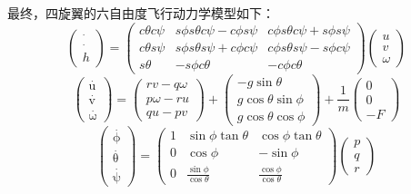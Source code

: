 最终，四旋翼的六自由度飞行动力学模型如下：
\begin{equation}
\left( \begin{array}{c}
\mathop {{p_n}}\limits^ \cdot  \\
\mathop {{p_e}}\limits^ \cdot  \\
h
\end{array} \right) = \left( {\begin{array}{*{20}{c}}
{c\theta c\psi }&{s\phi s\theta c\psi  - c\phi s\psi }&{c\phi s\theta c\psi  + s\phi s\psi }\\
{c\theta s\psi }&{s\phi s\theta s\psi  + c\phi c\psi }&{c\phi s\theta s\psi  - s\phi c\psi }\\
{s\theta }&{ - s\phi c\theta }&{ - c\phi c\theta }
\end{array}} \right)\left( \begin{array}{l}
u\\
v\\
\omega
\end{array} \right)
\end{equation}
\begin{equation}
\left( \begin{array}{l}
\mathop u\limits^ \cdot  \\
\mathop v\limits^ \cdot  \\
\mathop \omega \limits^ \cdot
\end{array} \right) = \left( \begin{array}{l}
rv - q\omega \\
p\omega  - ru\\
qu - pv
\end{array} \right) + \left( \begin{array}{c}
 - g\sin \theta \\
g\cos \theta \sin \phi \\
g\cos \theta \cos \phi
\end{array} \right) + \frac{1}{m}\left( \begin{array}{c}
0\\
0\\
 - F
\end{array} \right)
\end{equation}
\begin{equation}
\left( \begin{array}{l}
\mathop \phi \limits^ \cdot  \\
\mathop \theta \limits^ \cdot  \\
\mathop \psi \limits^ \cdot
\end{array} \right) = \left( {\begin{array}{*{20}{c}}
1&{\sin \phi \tan \theta }&{\cos \phi \tan \theta }\\
0&{\cos \phi }&{ - \sin \phi }\\
0&{\frac{{\sin \phi }}{{\cos \theta }}}&{\frac{{\cos \phi }}{{\cos \theta }}}
\end{array}} \right)\left( \begin{array}{l}
p\\
q\\
r
\end{array} \right)
\end{equation}
